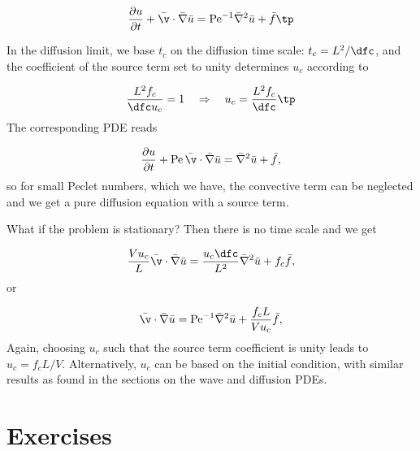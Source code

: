 \documentclass[graybox,envcountchap,sectrefs,final]{svmonodo}
\begin{document}
\[ \frac{\partial u}{\partial t} + \bar\v\cdot\bar \nabla\bar u =
\hbox{Pe}^{-1}\bar \nabla^2 \bar u + \bar f\tp
\]

In the diffusion limit, we base $t_c$ on the diffusion time scale:
$t_c=L^2/\dfc$, and the coefficient of the source term set to unity
determines $u_c$ according to

\[ \frac{L^2 f_c}{\dfc u_c} = 1\quad\Rightarrow\quad u_c = \frac{L^2 f_c}{\dfc}\tp\]
The corresponding PDE reads

\[ \frac{\partial u}{\partial t} + \hbox{Pe}\,\bar\v\cdot\bar \nabla\bar u =
\bar\nabla^2 \bar u + \bar f,
\]
so for small Peclet numbers, which we have, the convective term can
be neglected and we get a pure diffusion equation with a source term.

What if the problem is stationary?
Then there is no time scale and we get

\[
\frac{V u_c}{L}\bar\v\cdot\bar \nabla \bar u =
\frac{u_c \dfc}{L^2}\bar\nabla^2 \bar u + f_c\bar f,
\]
or

\[
\bar\v\cdot\bar \nabla \bar u =
\hbox{Pe}^{-1}\bar\nabla^2 \bar u + \frac{f_c L}{V u_c}\bar f,
\]
Again, choosing $u_c$ such that the source term coefficient is unity leads
to $u_c= f_c L/V$.
Alternatively, $u_c$ can be based on the initial condition, with similar
results as found in the sections on the wave and diffusion PDEs.

\section{Exercises}
\end{document}
